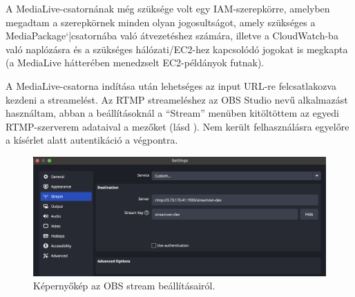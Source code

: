 A MediaLive-csatornának még szüksége volt egy IAM-szerepkörre, amelyben megadtam a szerepkörnek minden olyan jogosultságot, amely szükséges a MediaPackage`|csatornába való átvezetéshez számára, illetve a CloudWatch-ba való naplózásra és a szükséges hálózati/EC2-hez kapcsolódó jogokat is megkapta (a MediaLive hátterében menedzselt EC2-példányok futnak).

A MediaLive-csatorna indítása után lehetséges az input URL-re felcsatlakozva kezdeni a streamelést. Az RTMP streameléshez az OBS Studio nevű alkalmazást használtam\cite{obsMediaLive}, abban a beállításoknál a ``Stream'' menüben kitöltöttem az egyedi RTMP-szerverem adataival a mezőket (lásd ). Nem került felhasználásra egyelőre a kísérlet alatt autentikáció a végpontra.

\begin{figure}[ht]
  \centering
  \includegraphics[width=150mm, keepaspectratio]{figures/obs.png}
  \caption{Képernyőkép az OBS stream beállításairól.}
  \label{fig:obs}
\end{figure}
